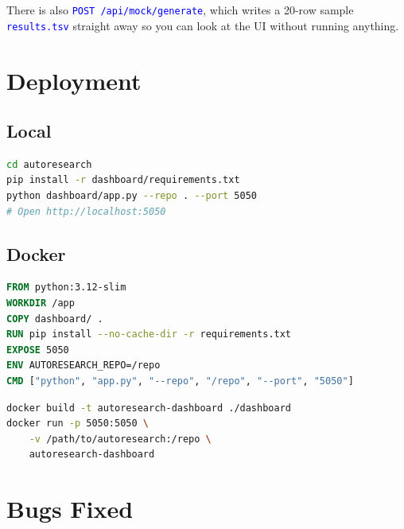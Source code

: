 \documentclass[11pt,a4paper]{article}
\newcommand{\code}[1]{\texttt{\textcolor{blue}{#1}}}
\begin{document}
There is also \code{POST /api/mock/generate}, which writes a 20-row sample \code{results.tsv}
straight away so you can look at the UI without running anything.

\section{Deployment}

\subsection{Local}

\begin{lstlisting}[language=bash, caption={Local setup}]
cd autoresearch
pip install -r dashboard/requirements.txt
python dashboard/app.py --repo . --port 5050
# Open http://localhost:5050
\end{lstlisting}

\subsection{Docker}

\begin{lstlisting}[language=Dockerfile, caption={Dockerfile}]
FROM python:3.12-slim
WORKDIR /app
COPY dashboard/ .
RUN pip install --no-cache-dir -r requirements.txt
EXPOSE 5050
ENV AUTORESEARCH_REPO=/repo
CMD ["python", "app.py", "--repo", "/repo", "--port", "5050"]
\end{lstlisting}

\begin{lstlisting}[language=bash, caption={Docker run with the repo mounted}]
docker build -t autoresearch-dashboard ./dashboard
docker run -p 5050:5050 \
    -v /path/to/autoresearch:/repo \
    autoresearch-dashboard
\end{lstlisting}

\section{Bugs Fixed}
\end{document}
